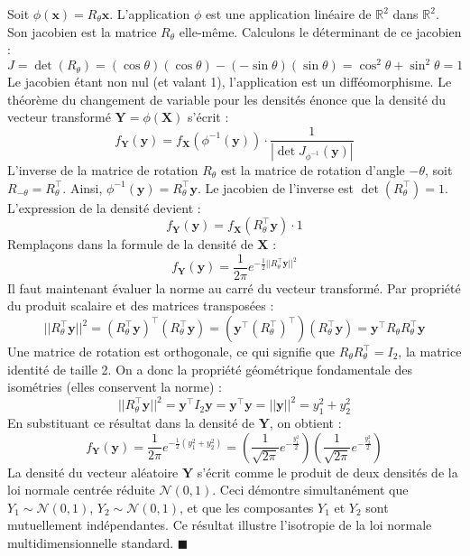 \documentclass[11pt,a4paper]{article}
\begin{document}
Soit $\phi(\mathbf{x}) = R_\theta \mathbf{x}$. L'application $\phi$ est une application linéaire de $\mathbb{R}^2$ dans $\mathbb{R}^2$. Son jacobien est la matrice $R_\theta$ elle-même.
Calculons le déterminant de ce jacobien :
$$ J = \det(R_\theta) = (\cos\theta)(\cos\theta) - (-\sin\theta)(\sin\theta) = \cos^2\theta + \sin^2\theta = 1 $$
Le jacobien étant non nul (et valant 1), l'application est un difféomorphisme.
Le théorème du changement de variable pour les densités énonce que la densité du vecteur transformé $\mathbf{Y} = \phi(\mathbf{X})$ s'écrit :
$$ f_\mathbf{Y}(\mathbf{y}) = f_\mathbf{X}(\phi^{-1}(\mathbf{y})) \cdot \frac{1}{|\det J_{\phi^{-1}}(\mathbf{y})|} $$
L'inverse de la matrice de rotation $R_\theta$ est la matrice de rotation d'angle $-\theta$, soit $R_{-\theta} = R_\theta^\top$.
Ainsi, $\phi^{-1}(\mathbf{y}) = R_\theta^\top \mathbf{y}$. Le jacobien de l'inverse est $\det(R_\theta^\top) = 1$. L'expression de la densité devient :
$$ f_\mathbf{Y}(\mathbf{y}) = f_\mathbf{X}(R_\theta^\top \mathbf{y}) \cdot 1 $$
Remplaçons dans la formule de la densité de $\mathbf{X}$ :
$$ f_\mathbf{Y}(\mathbf{y}) = \frac{1}{2\pi} e^{-\frac{1}{2}||R_\theta^\top \mathbf{y}||^2} $$
Il faut maintenant évaluer la norme au carré du vecteur transformé. Par propriété du produit scalaire et des matrices transposées :
$$ ||R_\theta^\top \mathbf{y}||^2 = (R_\theta^\top \mathbf{y})^\top (R_\theta^\top \mathbf{y}) = (\mathbf{y}^\top (R_\theta^\top)^\top) (R_\theta^\top \mathbf{y}) = \mathbf{y}^\top R_\theta R_\theta^\top \mathbf{y} $$
Une matrice de rotation est orthogonale, ce qui signifie que $R_\theta R_\theta^\top = I_2$, la matrice identité de taille 2.
On a donc la propriété géométrique fondamentale des isométries (elles conservent la norme) :
$$ ||R_\theta^\top \mathbf{y}||^2 = \mathbf{y}^\top I_2 \mathbf{y} = \mathbf{y}^\top \mathbf{y} = ||\mathbf{y}||^2 = y_1^2 + y_2^2 $$
En substituant ce résultat dans la densité de $\mathbf{Y}$, on obtient :
$$ f_\mathbf{Y}(\mathbf{y}) = \frac{1}{2\pi} e^{-\frac{1}{2}(y_1^2 + y_2^2)} = \left(\frac{1}{\sqrt{2\pi}} e^{-\frac{y_1^2}{2}}\right) \left(\frac{1}{\sqrt{2\pi}} e^{-\frac{y_2^2}{2}}\right) $$
La densité du vecteur aléatoire $\mathbf{Y}$ s'écrit comme le produit de deux densités de la loi normale centrée réduite $\mathcal{N}(0,1)$.
Ceci démontre simultanément que $Y_1 \sim \mathcal{N}(0,1)$, $Y_2 \sim \mathcal{N}(0,1)$, et que les composantes $Y_1$ et $Y_2$ sont mutuellement indépendantes. Ce résultat illustre l'isotropie de la loi normale multidimensionnelle standard. $\blacksquare$
\end{document}
